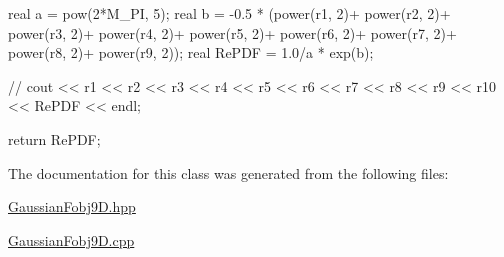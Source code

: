 \begin{DoxyCode}
{
    real a = pow(2*M_PI, 5);
    real b = -0.5 * (power(r1, 2)+ power(r2, 2)+ power(r3, 2)+
        power(r4, 2)+ power(r5, 2)+ power(r6, 2)+ power(r7, 2)+
        power(r8, 2)+ power(r9, 2));
    real RePDF = 1.0/a * exp(b);
    
  //  cout << r1 << r2 << r3 << r4 << r5 << r6 << r7 << r8 << r9 << r10 <<
       RePDF << endl;
    
    return RePDF;
}
\end{DoxyCode}


\-The documentation for this class was generated from the following files\-:\begin{DoxyCompactItemize}
\item 
\hyperlink{GaussianFobj9D_8hpp}{\-Gaussian\-Fobj9\-D.\-hpp}\item 
\hyperlink{GaussianFobj9D_8cpp}{\-Gaussian\-Fobj9\-D.\-cpp}\end{DoxyCompactItemize}
